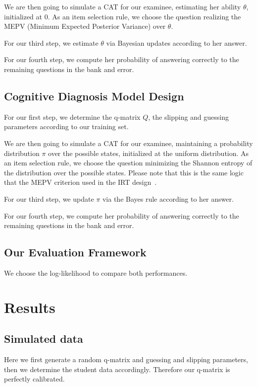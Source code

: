 \documentclass{sig-alternate}
\begin{document}
We are then going to simulate a CAT for our examinee, estimating her ability $\theta$, initialized at 0. As an item selection rule, we choose the question realizing the MEPV (Minimum Expected Posterior Variance) over $\theta$.

For our third step, we estimate $\theta$ via Bayesian updates according to her answer.

For our fourth step, we compute her probability of answering correctly to the remaining questions in the bank and error.

\subsection{Cognitive Diagnosis Model Design}

For our first step, we determine the q-matrix $Q$, the slipping and guessing parameters according to our training set.

We are then going to simulate a CAT for our examinee, maintaining a probability distribution $\pi$ over the possible states, initialized at the uniform distribution. As an item selection rule, we choose the question minimizing the Shannon entropy of the distribution over the possible states. Please note that this is the same logic that the MEPV criterion used in the IRT design~\cite{Cheng2009}.

For our third step, we update $\pi$ via the Bayes rule according to her answer.

For our fourth step, we compute her probability of answering correctly to the remaining questions in the bank and error.

\subsection{Our Evaluation Framework}

We choose the log-likelihood to compare both performances.

\section{Results}

\subsection{Simulated data}

Here we first generate a random q-matrix and guessing and slipping parameters, then we determine the student data accordingly. Therefore our q-matrix is perfectly calibrated.
\end{document}
